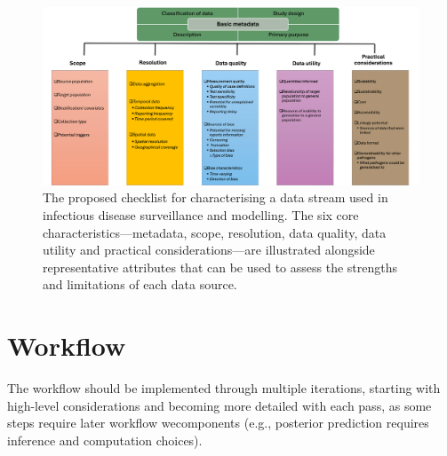 \documentclass{article}
\begin{document}
\begin{figure}[H] 
\includegraphics[width=1\linewidth]{figures/data_characteristics_2.png}
\centering
\caption{The proposed checklist for characterising a data stream used in infectious disease surveillance and modelling. The six core characteristics---metadata, scope, resolution, data quality, data utility and practical considerations---are illustrated alongside representative attributes that can be used to assess the strengths and limitations of each data source. }
\label{data_characteristics}
\end{figure}


\section{Workflow}
\label{sec:workflow}

The workflow should be implemented through multiple iterations, starting with high-level considerations and becoming more detailed with each pass, as some steps require later workflow wecomponents (e.g., posterior prediction requires inference and computation choices).
\end{document}
